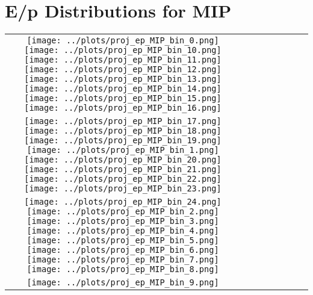 \documentclass[a4paper,10pt]{article}
\begin{document}
\section*{E/p Distributions for MIP}
\begin{center}
\setlength{\tabcolsep}{2pt}
\renewcommand{\arraystretch}{1.0}
\begin{tabular}{cccccccc}
    \texttt{[image: ../plots/proj\_ep\_MIP\_bin\_0.png]} %
    \texttt{[image: ../plots/proj\_ep\_MIP\_bin\_10.png]} %
    \texttt{[image: ../plots/proj\_ep\_MIP\_bin\_11.png]} %
    \texttt{[image: ../plots/proj\_ep\_MIP\_bin\_12.png]} %
    \texttt{[image: ../plots/proj\_ep\_MIP\_bin\_13.png]} %
    \texttt{[image: ../plots/proj\_ep\_MIP\_bin\_14.png]} %
    \texttt{[image: ../plots/proj\_ep\_MIP\_bin\_15.png]} %
    \texttt{[image: ../plots/proj\_ep\_MIP\_bin\_16.png]} \\
    \texttt{[image: ../plots/proj\_ep\_MIP\_bin\_17.png]} %
    \texttt{[image: ../plots/proj\_ep\_MIP\_bin\_18.png]} %
    \texttt{[image: ../plots/proj\_ep\_MIP\_bin\_19.png]} %
    \texttt{[image: ../plots/proj\_ep\_MIP\_bin\_1.png]} %
    \texttt{[image: ../plots/proj\_ep\_MIP\_bin\_20.png]} %
    \texttt{[image: ../plots/proj\_ep\_MIP\_bin\_21.png]} %
    \texttt{[image: ../plots/proj\_ep\_MIP\_bin\_22.png]} %
    \texttt{[image: ../plots/proj\_ep\_MIP\_bin\_23.png]} \\
    \texttt{[image: ../plots/proj\_ep\_MIP\_bin\_24.png]} %
    \texttt{[image: ../plots/proj\_ep\_MIP\_bin\_2.png]} %
    \texttt{[image: ../plots/proj\_ep\_MIP\_bin\_3.png]} %
    \texttt{[image: ../plots/proj\_ep\_MIP\_bin\_4.png]} %
    \texttt{[image: ../plots/proj\_ep\_MIP\_bin\_5.png]} %
    \texttt{[image: ../plots/proj\_ep\_MIP\_bin\_6.png]} %
    \texttt{[image: ../plots/proj\_ep\_MIP\_bin\_7.png]} %
    \texttt{[image: ../plots/proj\_ep\_MIP\_bin\_8.png]} \\
    \texttt{[image: ../plots/proj\_ep\_MIP\_bin\_9.png]} %
\end{tabular}
\end{center}
\end{document}
